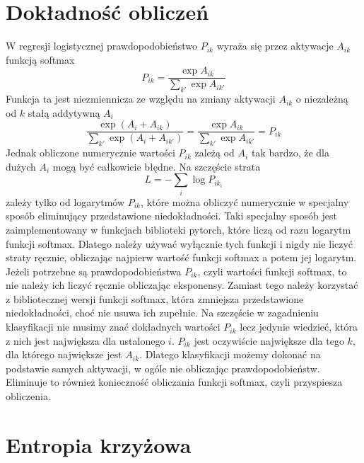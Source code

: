 \documentclass[10pt,a4paper]{article}
\begin{document}
\section{Dokładność obliczeń}

W regresji logistycznej prawdopodobieństwo $P_{ik}$ wyraża się przez aktywacje $A_{ik}$ funkcją softmax
\begin{displaymath}
P_{ik}=\frac{\exp A_{ik}}{\sum_{k'}\exp A_{ik'}}
\end{displaymath}
Funkcja ta jest niezmiennicza ze względu na zmiany aktywacji $A_{ik}$ o niezależną od $k$ stałą addytywną $A_i$
\begin{displaymath}
\frac{\exp(A_i+A_{ik})}{\sum_{k'}\exp(A_i+A_{ik'})}=\frac{\exp A_{ik}}{\sum_{k'}\exp A_{ik'}}=P_{ik}
\end{displaymath}
Jednak obliczone numerycznie wartości $P_{ik}$ zależą od $A_i$ tak bardzo, że dla dużych $A_i$ mogą być całkowicie błędne. Na szczęście strata
\begin{displaymath}
L=-\sum_i\log P_{ik_i}
\end{displaymath}
zależy tylko od logarytmów $P_{ik}$, które można obliczyć numerycznie w specjalny sposób eliminujący przedstawione niedokładności. Taki specjalny sposób jest zaimplementowany w funkcjach biblioteki pytorch, które liczą od razu logarytm funkcji softmax. Dlatego należy używać wyłącznie tych funkcji i nigdy nie liczyć straty ręcznie, obliczając najpierw wartość funkcji softmax a potem jej logarytm. Jeżeli potrzebne są prawdopodobieństwa $P_{ik}$, czyli wartości funkcji softmax, to nie należy ich liczyć ręcznie obliczając eksponensy. Zamiast tego należy korzystać z bibliotecznej wersji funkcji softmax, która zmniejsza przedstawione niedokładności, choć nie usuwa ich zupełnie. Na szczęście w zagadnieniu klasyfikacji nie musimy znać dokładnych wartości $P_{ik}$ lecz jedynie wiedzieć, która z nich jest największa dla ustalonego $i$. $P_{ik}$ jest oczywiście największe dla tego $k$, dla którego największe jest $A_{ik}$. Dlatego klasyfikacji możemy dokonać na podstawie samych aktywacji, w ogóle nie obliczając prawdopodobieństw. Eliminuje to również konieczność obliczania funkcji softmax, czyli przyspiesza obliczenia.

\section{Entropia krzyżowa}
\end{document}
